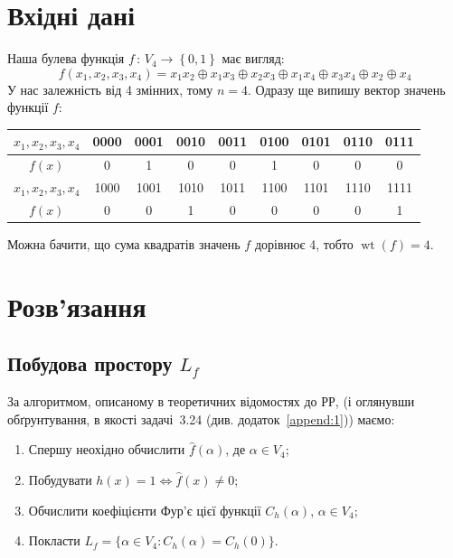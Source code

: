 \section{Вхідні дані}
\label{sec:inputdata}
Наша булева функція $f \, : \, V_{4} \rightarrow \left\{0, 1\right\}$ має вигляд:
\begin{equation*}
    f \left(x_{1}, x_{2}, x_{3}, x_{4}\right) = x_{1}x_{2} \oplus x_{1}x_{3} \oplus x_{2}x_{3} \oplus x_{1}x_{4} \oplus x_{3}x_{4} \oplus x_{2} \oplus x_{4}
\end{equation*}
У нас залежність від 4 змінних, тому $n=4$. Одразу ще випишу вектор значень функції $f$:
\begin{center}
    \renewcommand{\arraystretch}{1.2}
    \begin{tabular}{c|cccccccc}
        $x_{1}, x_{2}, x_{3}, x_{4}$ & 0000 & 0001 & 0010 & 0011 & 0100 & 0101 & 0110 & 0111 \\
        \hline
        $f(x)$                       & 0    & 1    & 0    & 0    & 1    & 0    & 0    & 0    \\
        \noalign{\smallskip} \hline \noalign{\smallskip}
        $x_{1}, x_{2}, x_{3}, x_{4}$ & 1000 & 1001 & 1010 & 1011 & 1100 & 1101 & 1110 & 1111 \\
        \hline
        $f(x)$                       & 0    & 0    & 1    & 0    & 0    & 0    & 0    & 1    \\
    \end{tabular}
\end{center}
Можна бачити, що сума квадратів значень $f$ дорівнює 4, тобто $\operatorname{wt}(f) = 4$.

\section{Розв'язання}

\subsection{Побудова простору \texorpdfstring{$L_{f}$}{Lf}}

За алгоритмом, описаному в теоретичних відомостях до РР, (і оглянувши обґрунтування, в якості задачі~3.24 
(див. додаток~\ref{append:1})) маємо:
\begin{enumerate}[leftmargin=2em]
    \item Спершу неохідно обчислити $\hat{f}(\alpha)$, де $\alpha \in V_{4}$;
    \item Побудувати $h(x) = 1 \Leftrightarrow \hat{f}(x) \neq 0$;
    \item Обчислити коефіцієнти Фур'є цієї функції $C_h(\alpha)$, $\alpha \in V_{4}$;
    \item Покласти $L_{f} = \{\alpha \in V_{4} : C_h(\alpha) = C_h(0)\}$.
\end{enumerate}

